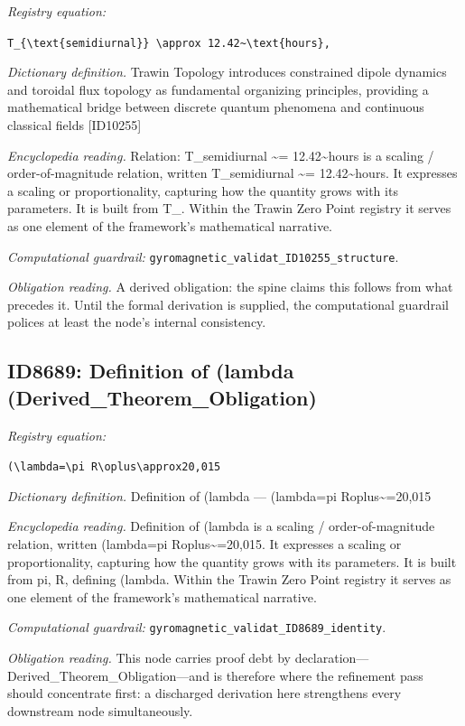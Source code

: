 \documentclass[11pt]{article}
\theoremstyle{remark}
\begin{document}
\noindent\textit{Registry equation:}\par
{\small\texttt{T\_\{\textbackslash{}text\{semidiurnal\}\} \textbackslash{}approx 12.42\textasciitilde{}\textbackslash{}text\{hours\},}}\par\medskip
\noindent\textit{Dictionary definition.} Trawin Topology introduces constrained dipole dynamics and toroidal flux topology as fundamental organizing principles, providing a mathematical bridge between discrete quantum phenomena and continuous classical fields [ID10255]\par\medskip
\noindent\textit{Encyclopedia reading.} Relation: T\_semidiurnal \textasciitilde{}= 12.42\textasciitilde{}hours is a scaling / order-of-magnitude relation, written T\_semidiurnal \textasciitilde{}= 12.42\textasciitilde{}hours. It expresses a scaling or proportionality, capturing how the quantity grows with its parameters. It is built from T\_. Within the Trawin Zero Point registry it serves as one element of the framework's mathematical narrative.
\par\medskip\noindent\textit{Computational guardrail:} \texttt{gyromagnetic\_validat\_ID10255\_structure}.
\par\medskip\noindent\textit{Obligation reading.} A derived obligation: the spine claims this follows from what precedes it. Until the formal derivation is supplied, the computational guardrail polices at least the node's internal consistency.

\subsection{ID8689: Definition of (lambda (Derived\_Theorem\_Obligation)}

\noindent\textit{Registry equation:}\par
{\small\texttt{(\textbackslash{}lambda=\textbackslash{}pi R\textbackslash{}oplus\textbackslash{}approx20,015}}\par\medskip
\noindent\textit{Dictionary definition.} Definition of (lambda --- (lambda=pi Roplus\textasciitilde{}=20,015\par\medskip
\noindent\textit{Encyclopedia reading.} Definition of (lambda is a scaling / order-of-magnitude relation, written (lambda=pi Roplus\textasciitilde{}=20,015. It expresses a scaling or proportionality, capturing how the quantity grows with its parameters. It is built from pi, R, defining (lambda. Within the Trawin Zero Point registry it serves as one element of the framework's mathematical narrative.
\par\medskip\noindent\textit{Computational guardrail:} \texttt{gyromagnetic\_validat\_ID8689\_identity}.
\par\medskip\noindent\textit{Obligation reading.} This node carries proof debt by declaration---Derived\_Theorem\_Obligation---and is therefore where the refinement pass should concentrate first: a discharged derivation here strengthens every downstream node simultaneously.
\end{document}
